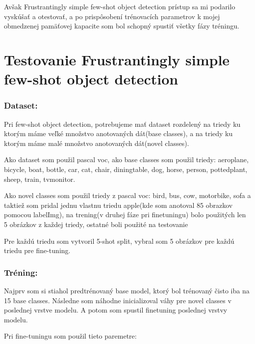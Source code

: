 Avšak Frustrantingly simple few-shot object detection prístup sa mi podarilo vyskúšať a otestovať, a po prispôsobení trénovacích parametrov k mojej obmedzenej pamäťovej kapacite som bol schopný spustiť všetky fázy tréningu. 

\section{Testovanie Frustrantingly simple few-shot object detection}

\subsubsection{Dataset:}
Pri few-shot object detection, potrebujeme mať dataset rozdelený na triedy ku ktorým máme veľké množstvo anotovaných dát(base classes), a na triedy ku ktorým máme malé množstvo anotovaných dát(novel classes).

Ako dataset som použil pascal voc, ako base classes som použil triedy:
aeroplane, bicycle, boat, bottle, car, cat, chair, diningtable, dog, horse, person, pottedplant, sheep,
train, tvmonitor.

Ako novel classes som použil triedy z pascal voc:
bird, bus, cow, motorbike, sofa a taktiež som pridal jednu vlastnu triedu apple(kde som anotoval 85
obrazkov pomocou labelImg), na trening(v druhej fáze pri finetuningu) bolo použitých len 5
obrázkov z každej triedy, ostatné boli použité na testovanie

Pre každú triedu som vytvoril 5-shot split, vybral som 5 obrázkov pre každú triedu pre fine-tuning.

\subsubsection{Tréning:}
Najprv som si stiahol predtrénovaný base model, ktorý bol trénovaný čisto iba na 15 base classes.
Následne som náhodne inicializoval váhy pre novel classes v poslednej vrstve modelu. A potom
som spustil finetuning poslednej vrstvy modelu.

Pri fine-tuningu som použil tieto paremetre:

